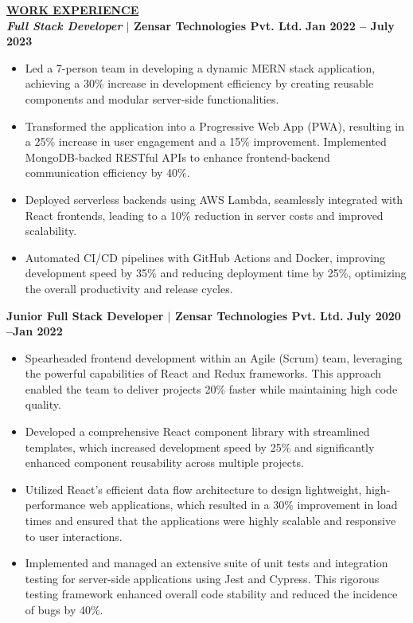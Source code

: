 \documentclass{article}
\begin{document}

\noindent \textbf{\underline{WORK EXPERIENCE}} \\
\noindent \textbf{\textit{Full Stack Developer} $\mid$ Zensar Technologies Pvt. Ltd.}  \hfill \textbf{Jan 2022 – July 2023}
\begin{itemize}[noitemsep,nolistsep,leftmargin=*]
   \item Led a 7-person team in developing a dynamic MERN stack application, achieving a 30\% increase in development efficiency by creating reusable components and modular server-side functionalities.
   \item Transformed the application into a Progressive Web App (PWA), resulting in a 25\% increase in user engagement and a 15\% improvement. Implemented MongoDB-backed RESTful APIs to enhance frontend-backend communication efficiency by 40\%.
   \item Deployed serverless backends using AWS Lambda, seamlessly integrated with React frontends, leading to a 10\% reduction in server costs and improved scalability.
   \item Automated CI/CD pipelines with GitHub Actions and Docker, improving development speed by 35\% and reducing deployment time by 25\%, optimizing the overall productivity and release cycles.
\end{itemize}

\vspace{1mm}

\noindent \textbf{Junior Full Stack Developer $\mid$ Zensar Technologies Pvt. Ltd.} \hfill \textbf{July 2020 –Jan 2022}
\begin{itemize}[noitemsep,nolistsep,leftmargin=*]
     \item Spearheaded frontend development within an Agile (Scrum) team, leveraging the powerful capabilities of React and Redux frameworks. This approach enabled the team to deliver projects 20\% faster while maintaining high code quality.
    \item Developed a comprehensive React component library with streamlined templates, which increased development speed by 25\% and significantly enhanced component reusability across multiple projects.
    \item Utilized React's efficient data flow architecture to design lightweight, high-performance web applications, which resulted in a 30\% improvement in load times and ensured that the applications were highly scalable and responsive to user interactions.
    \item Implemented and managed an extensive suite of unit tests and integration testing for server-side applications using Jest and Cypress. This rigorous testing framework enhanced overall code stability and reduced the incidence of bugs by 40\%.\\
\end{itemize}
\end{document}
